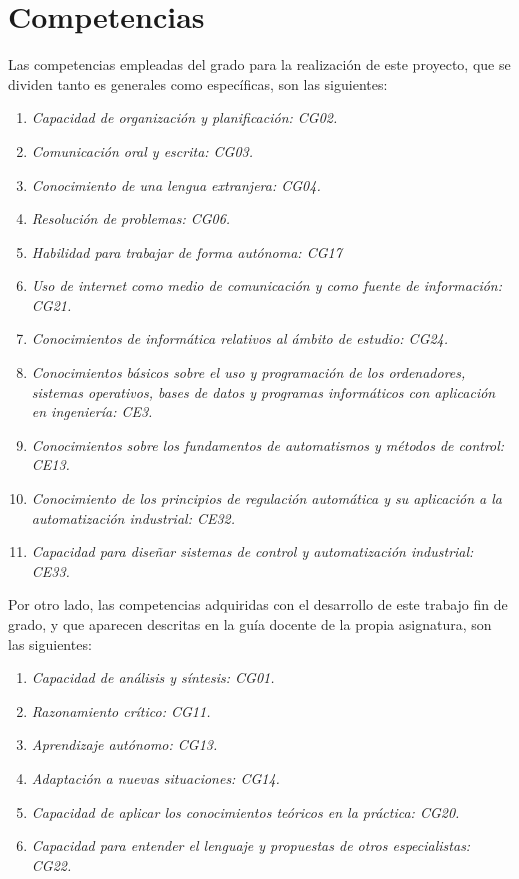\section{Competencias}
\label{sec:competencias}

Las competencias empleadas del grado para la realización de este proyecto, que se dividen tanto es generales como específicas, son las siguientes:
\begin{enumerate} 
  \item \textit{Capacidad de organización y planificación: CG02.}
  \item \textit{Comunicación oral y escrita: CG03.}
  \item \textit{Conocimiento de una lengua extranjera: CG04.}
  \item \textit{Resolución de problemas: CG06.}
  \item \textit{Habilidad para trabajar de forma autónoma: CG17}
  \item \textit{Uso de internet como medio de comunicación y como fuente de información: CG21.}
  \item \textit{Conocimientos de informática relativos al ámbito de estudio: CG24.}
  \item \textit{Conocimientos básicos sobre el uso y programación de los ordenadores, sistemas operativos, bases de datos y programas informáticos con aplicación en ingeniería: CE3.}
  \item \textit{Conocimientos sobre los fundamentos de automatismos y métodos de control: CE13.}
  \item \textit{Conocimiento de los principios de regulación automática y su aplicación a la automatización industrial: CE32.}
  \item \textit{Capacidad para diseñar sistemas de control y automatización industrial: CE33.}
  
\end{enumerate}  

Por otro lado, las competencias adquiridas con el desarrollo de este trabajo fin de grado, y que aparecen descritas en la guía docente de la propia asignatura, son las siguientes:
\begin{enumerate}
  \item \textit{Capacidad de análisis y síntesis: CG01.} 
  \item \textit{Razonamiento crítico: CG11.}
  \item \textit{Aprendizaje autónomo: CG13.}
  \item \textit{Adaptación a nuevas situaciones: CG14.}
  \item \textit{Capacidad de aplicar los conocimientos teóricos en la práctica: CG20.}
  \item \textit{Capacidad para entender el lenguaje y propuestas de otros especialistas: CG22.}
\end{enumerate} 

